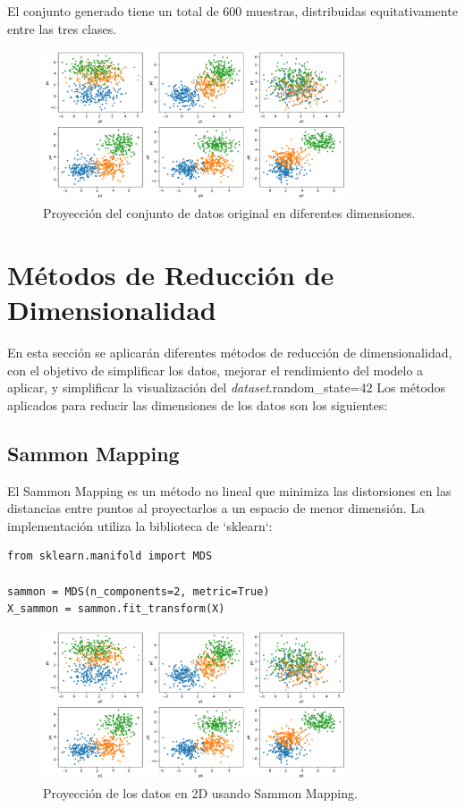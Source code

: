 \documentclass[paper=a4, fontsize=11pt]{scrartcl} %
\numberwithin{equation}{section} %
\numberwithin{figure}{section} %
\numberwithin{table}{section} %
\begin{document}
El conjunto generado tiene un total de 600 muestras, distribuidas equitativamente entre las tres clases.

\begin{figure}[H]
\centering
\includegraphics[width=0.8\textwidth]{images/dataset_projection.png}
\caption{Proyección del conjunto de datos original en diferentes dimensiones.}
\end{figure}

\section{Métodos de Reducción de Dimensionalidad}

En esta sección se aplicarán diferentes métodos de reducción de dimensionalidad, con el objetivo de simplificar los datos, mejorar el rendimiento del modelo a aplicar, y simplificar la visualización del \textit{dataset}.random_state=42
Los métodos aplicados para reducir las dimensiones de los datos son los siguientes:

\subsection{Sammon Mapping}
El Sammon Mapping es un método no lineal que minimiza las distorsiones en las distancias entre puntos al proyectarlos a un espacio de menor dimensión. La implementación utiliza la biblioteca de `sklearn`:

\begin{verbatim}
from sklearn.manifold import MDS

sammon = MDS(n_components=2, metric=True)
X_sammon = sammon.fit_transform(X)
\end{verbatim}

\begin{figure}[H]
\centering
\includegraphics[width=0.8\textwidth]{images/sammon_projection.png}
\caption{Proyección de los datos en 2D usando Sammon Mapping.}
\end{figure}
\end{document}
